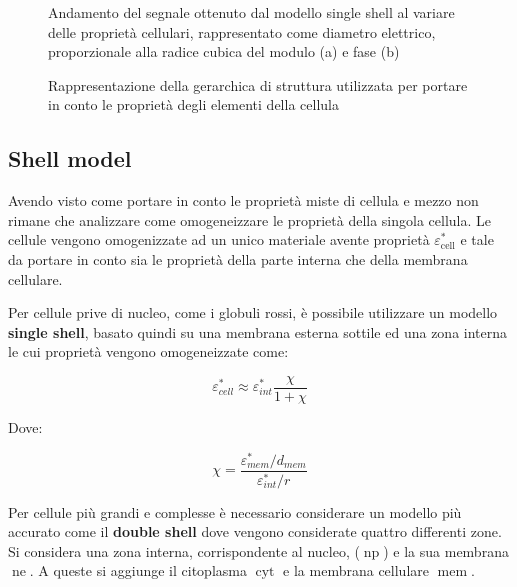 \begin{figure}[t!]
\begin{subfigure}{0.5\linewidth}
		\caption{}
		\label{fig:phase}
	\end{subfigure}
	\caption{Andamento del segnale ottenuto dal modello single shell al variare delle proprietà cellulari, rappresentato come diametro elettrico, proporzionale alla radice cubica del modulo (a) e fase (b)}
	\label{fig:risultati}
\end{figure}

\begin{figure}[b!]
	\centering
	\footnotesize{\def\svgwidth{0.95\linewidth}
	}
	\caption{Rappresentazione della gerarchica di struttura utilizzata per portare in conto le proprietà degli elementi della cellula}
	\label{fig:structure}
\end{figure}


\subsection{Shell model}

Avendo visto come portare in conto le proprietà miste di cellula e mezzo non rimane che analizzare come omogeneizzare le proprietà della singola cellula. 
Le cellule vengono omogenizzate ad un unico materiale avente proprietà $\varepsilon^*_{\operatorname{cell}}$ e tale da portare in conto sia le proprietà della parte interna che della membrana cellulare.

Per cellule prive di nucleo, come i globuli rossi, è possibile utilizzare un modello \textbf{single shell}, basato quindi su una membrana esterna sottile ed una zona interna le cui proprietà vengono omogeneizzate come:

\begin{equation}
	\varepsilon_{c e l l}^{*} \approx \varepsilon_{i n t}^{*} \frac{\chi}{1+\chi}
	\label{eq:shell}
\end{equation}

Dove:

\begin{equation}
	\chi=\frac{\varepsilon_{m e m}^{*} / d_{m e m}}{\varepsilon_{i n t}^{*} / r}
\end{equation}

Per cellule più grandi e complesse è necessario considerare un modello più accurato come il \textbf{double shell} dove vengono considerate quattro differenti zone. Si considera una zona interna, corrispondente al nucleo, ($\operatorname{np}$) e la sua membrana $\operatorname{ne}$. A queste si aggiunge il citoplasma $\operatorname{cyt}$ e la membrana cellulare $\operatorname{mem}$. 

